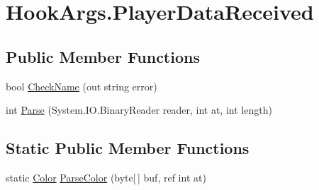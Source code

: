 \hypertarget{structOTA_1_1Plugin_1_1HookArgs_1_1PlayerDataReceived}{}\section{Hook\+Args.\+Player\+Data\+Received}
\label{structOTA_1_1Plugin_1_1HookArgs_1_1PlayerDataReceived}
\subsection*{Public Member Functions}
\begin{DoxyCompactItemize}
\item 
bool \hyperlink{structOTA_1_1Plugin_1_1HookArgs_1_1PlayerDataReceived_adf82059dd52849d382e3a8715f54c80a}{Check\+Name} (out string error)
\item 
int \hyperlink{structOTA_1_1Plugin_1_1HookArgs_1_1PlayerDataReceived_a0945e3fc0fe0a591f1bc0140a68649b0}{Parse} (System.\+I\+O.\+Binary\+Reader reader, int at, int length)
\end{DoxyCompactItemize}
\subsection*{Static Public Member Functions}
\begin{DoxyCompactItemize}
\item 
static \hyperlink{structMicrosoft_1_1Xna_1_1Framework_1_1Color}{Color} \hyperlink{structOTA_1_1Plugin_1_1HookArgs_1_1PlayerDataReceived_a800b7dcbb0939f7ebe6996ff13c04f2c}{Parse\+Color} (byte\mbox{[}$\,$\mbox{]} buf, ref int at)
\end{DoxyCompactItemize}
